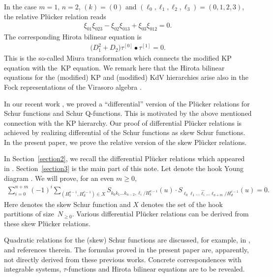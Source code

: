 \documentclass[10pt,a4paper]{amsart}
\numberwithin{equation}{section}
\begin{document}
In the case $m=1$, $n=2$, $(k) = (0)$ and $(\ell_0,\ell_1, \ell_2, \ell_3) = (0,1,2,3)$, the relative Pl\"ucker relation reads
\begin{gather*}
\xi_{01}\xi_{023} - \xi_{02}\xi_{013} + \xi_{03}\xi_{012} = 0.
\end{gather*}
The corresponding Hirota bilinear equation is
\begin{gather*}
\bigl(D_1^2 + D_2\bigr) \tau^{[0]}\bullet \tau^{[1]} = 0.
\end{gather*}
This is the so-called Miura transformation which connects the modified KP equation with the~KP equation.
We remark here that the Hirota bilinear equations for the (modified) KP and (modified) KdV hierarchies arise also in the Fock representations of the Virasoro algebra \cite{asy1,asy2}.

In our recent work \cite{asy3}, we proved a ``differential'' version of the Pl\"ucker relations for Schur functions and Schur Q-functions.
This is motivated by the above mentioned connection with the KP hierarchy. Our proof of differential Pl\"ucker relations is achieved by realizing differential of the Schur functions as skew Schur functions. In the present paper, we prove the relative version of the skew Pl\"ucker relations.



In Section~\ref{section2}, we recall the differential Pl\"ucker relations which appeared in \cite{asy3}.
Section~\ref{section3} is the main part of this note.
Let  denote the hook Young diagram . We will prove, for an even $m\geq 0$,
\begin{gather*}
\sum_{i=0}^{n+m}{(-1)}^{i}\sum_{(H^{a-1}_{b},H^{c-1}_{d})\in X}S_{k_0k_1\dots k_{n-2},\ell_i/H^{a-1}_{b}}(u)\cdot S_{\ell_0\ell_1\dots\widehat{\ell_i}\dots\ell_{n+m}/H^{c-1}_{d}}(u)=0.
\end{gather*}
Here  denotes the skew Schur function and $X$ denotes the set of the hook partitions of size~$N_{\geq0}$. Various differential Pl\"ucker relations can be derived from these skew Pl\"ucker relations.

Quadratic relations for the (skew) Schur functions are discussed, for example, in \cite{bbt, g, hb}, and references therein.
The formulas proved in the present paper are, apparently, not directly derived from these previous works.
Concrete correspondences with integrable systems, $\tau$-functions and Hirota bilinear equations are to be revealed.
\end{document}
